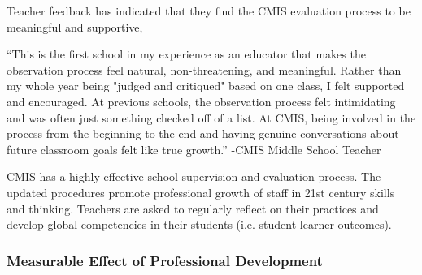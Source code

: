 \begin{findings}
Teacher feedback has indicated that they find the CMIS evaluation process to be meaningful and supportive,  

``This is the first school in my experience as an educator that makes the observation process feel natural, non-threatening, and meaningful. Rather than my whole year being "judged and critiqued" based on one class, I felt supported and encouraged. At previous schools, the observation process felt intimidating and was often just something checked off of a list. At CMIS, being involved in the process from the beginning to the end and having genuine conversations about future classroom goals felt like true growth.''
                                                                                            -CMIS Middle School Teacher


CMIS has a highly effective school supervision and evaluation process. The updated procedures promote professional growth of staff in 21st century skills and thinking. Teachers are asked to regularly reflect on their practices and develop global competencies in their students (i.e. student learner outcomes). 
\end{findings}

\subsubsection{Measurable Effect of Professional Development}



